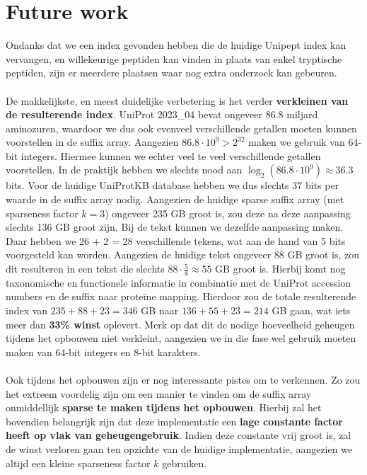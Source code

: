 \section{Future work}
Ondanks dat we een index gevonden hebben die de huidige Unipept index kan vervangen, en willekeurige peptiden kan vinden in plaats van enkel tryptische peptiden, zijn er meerdere plaatsen waar nog extra onderzoek kan gebeuren.
\\ \\
De makkelijkste, en meest duidelijke verbetering is het verder \textbf{verkleinen van de resulterende index}.
UniProt 2023\_04 bevat ongeveer 86.8 miljard aminozuren, waardoor we dus ook evenveel verschillende getallen moeten kunnen voorstellen in de suffix array.
Aangezien $86.8 \cdot 10^9 > 2^{32}$ maken we gebruik van 64-bit integers.
Hiermee kunnen we echter veel te veel verschillende getallen voorstellen.
In de praktijk hebben we slechts nood aan $\log_2(86.8 \cdot 10^9) \approx 36.3$ bits.
Voor de huidige UniProtKB database hebben we dus slechts 37 bits per waarde in de suffix array nodig.
Aangezien de huidige sparse suffix array (met sparseness factor $k = 3$) ongeveer 235 GB groot is, zou deze na deze aanpassing slechts 136 GB groot zijn.
Bij de tekst kunnen we dezelfde aanpassing maken.
Daar hebben we 26 + 2 = 28 verschillende tekens, wat aan de hand van 5 bits voorgesteld kan worden.
Aangezien de huidige tekst ongeveer 88 GB groot is, zou dit resulteren in een tekst die slechts $88 \cdot \frac{5}{8} \approx 55$ GB groot is.
Hierbij komt nog taxonomische en functionele informatie in combinatie met de UniProt accession numbers en de suffix naar proteïne mapping.
Hierdoor zou de totale resulterende index van $235 + 88 + 23 = 346$ GB naar $136 + 55 + 23 = 214$ GB gaan, wat iets meer dan \textbf{33\% winst} oplevert.
Merk op dat dit de nodige hoeveelheid geheugen tijdens het opbouwen niet verkleint, aangezien we in die fase wel gebruik moeten maken van 64-bit integers en 8-bit karakters.
\\ \\
Ook tijdens het opbouwen zijn er nog interessante pistes om te verkennen.
Zo zou het extreem voordelig zijn om een manier te vinden om de suffix array onmiddellijk \textbf{sparse te maken tijdens het opbouwen}.
Hierbij zal het bovendien belangrijk zijn dat deze implementatie een \textbf{lage constante factor heeft op vlak van geheugengebruik}.
Indien deze constante vrij groot is, zal de winst verloren gaan ten opzichte van de huidige implementatie, aangezien we altijd een kleine sparseness factor $k$ gebruiken.
